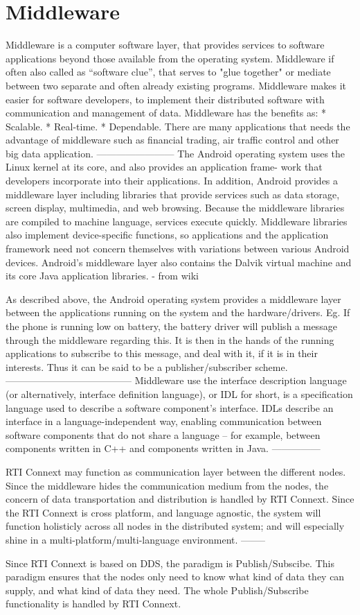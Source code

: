 \section{Middleware}
Middleware is a computer software layer, that provides services to software applications beyond those available from the operating system. Middleware if often also called as “software clue”,  that serves to "glue together" or mediate between two separate and often already existing programs. Middleware makes it easier for software developers, to implement their distributed software with communication and management of data.
Middleware has the benefits as:
* Scalable.
* Real-time.
* Dependable.
There are many applications that needs the advantage of middleware such as financial trading, air traffic control and other big data application.
————————
The Android operating system uses the Linux kernel at its core, and also provides an application frame- work that developers incorporate into their applications. In addition, Android provides a middleware layer including libraries that provide services such as data storage, screen display, multimedia, and web browsing. Because the middleware libraries are compiled to machine language, services execute quickly. Middleware libraries also implement device-specific functions, so applications and the application framework need not concern themselves with variations between various Android devices. Android’s middleware layer also contains the Dalvik virtual machine and its core Java application libraries. - from wiki

As described above, the Android operating system provides a middleware layer between the applications running on the system and the hardware/drivers. Eg. If the phone is running low on battery, the battery driver will publish a message through the middleware regarding this. It is then in the hands of the running applications to subscribe to this message, and deal with it, if it is in their interests. Thus it can be said to be a publisher/subscriber scheme.
—————————————
Middleware use the interface description language (or alternatively, interface definition language), or IDL for short, is a specification language used to describe a software component's interface. IDLs describe an interface in a language-independent way, enabling communication between software components that do not share a language – for example, between components written in C++ and components written in Java.
---------------

RTI Connext may function as communication layer between the different nodes. Since the middleware hides the communication medium from the nodes, the concern of data transportation and distribution is handled by RTI Connext.
Since the RTI Connext is cross platform, and language agnostic, the system will function holisticly across all nodes in the distributed system; and will especially shine in a multi-platform/multi-language environment.
--------

Since RTI Connext is based on DDS, the paradigm is Publish/Subscibe. This paradigm ensures that the nodes only need to know what kind of data they can supply, and what kind of data they need. The whole Publish/Subscribe functionality is handled by RTI Connext. 